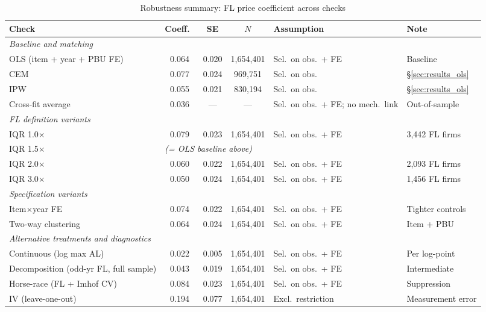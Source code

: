 \begin{table}[htbp]
\centering
\caption{Robustness summary: FL price coefficient across checks}
\label{tab:robustness_summary}
\small
\begin{tabular}{lcccll}
\hline\hline
Check & Coeff.\ & SE & $N$ & Assumption & Note \\
\hline
\multicolumn{6}{l}{\textit{Baseline and matching}} \\
OLS (item + year + PBU FE) & 0.064 & 0.020 & 1{,}654{,}401 & Sel.\ on obs.\ + FE & Baseline \\
CEM & 0.077 & 0.024 & 969{,}751 & Sel.\ on obs. & \S\ref{sec:results_ols} \\
IPW & 0.055 & 0.021 & 830{,}194 & Sel.\ on obs. & \S\ref{sec:results_ols} \\
Cross-fit average & 0.036 & --- & --- & Sel.\ on obs.\ + FE; no mech.\ link & Out-of-sample \\
\hline
\multicolumn{6}{l}{\textit{FL definition variants}} \\
IQR 1.0$\times$ & 0.079 & 0.023 & 1{,}654{,}401 & Sel.\ on obs.\ + FE & 3{,}442 FL firms \\
IQR 1.5$\times$ & \multicolumn{5}{l}{\textit{(= OLS baseline above)}} \\
IQR 2.0$\times$ & 0.060 & 0.022 & 1{,}654{,}401 & Sel.\ on obs.\ + FE & 2{,}093 FL firms \\
IQR 3.0$\times$ & 0.050 & 0.024 & 1{,}654{,}401 & Sel.\ on obs.\ + FE & 1{,}456 FL firms \\
\hline
\multicolumn{6}{l}{\textit{Specification variants}} \\
Item$\times$year FE & 0.074 & 0.022 & 1{,}654{,}401 & Sel.\ on obs.\ + FE & Tighter controls \\
Two-way clustering & 0.064 & 0.024 & 1{,}654{,}401 & Sel.\ on obs.\ + FE & Item + PBU \\
\hline
\multicolumn{6}{l}{\textit{Alternative treatments and diagnostics}} \\
Continuous (log max AL) & 0.022 & 0.005 & 1{,}654{,}401 & Sel.\ on obs.\ + FE & Per log-point \\
Decomposition (odd-yr FL, full sample) & 0.043 & 0.019 & 1{,}654{,}401 & Sel.\ on obs.\ + FE & Intermediate \\
Horse-race (FL + Imhof CV) & 0.084 & 0.023 & 1{,}654{,}401 & Sel.\ on obs.\ + FE & Suppression \\
IV (leave-one-out) & 0.194 & 0.077 & 1{,}654{,}401 & Excl.\ restriction & Measurement error \\

\end{tabular}
\end{table}
